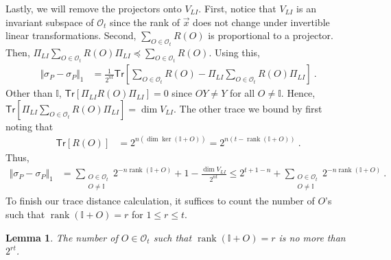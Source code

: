 \documentclass[11pt]{article}
\newtheorem{lemma}[theorem]{Lemma}
\newcommand{\id}{\ensuremath{\mathbb{I}}}
\newcommand{\Tr}{\mathsf{Tr}}
\newcommand{\Oc}{\mathcal{O}}
\DeclareMathOperator{\rank}{rank}
\begin{document}
Lastly, we will remove the projectors onto $V_{LI}$. First, notice that $V_{LI}$ is an invariant subspace of $\Oc_t$ since the rank of $\vec{x}$ does not change under invertible linear transformations. Second, $\sum_{O\in\Oc_t} R(O)$ is proportional to a projector. Then, $\Pi_{LI} \sum_{O\in\Oc_t} R(O) \Pi_{LI} \preceq \sum_{O\in\Oc_t} R(O)$. Using this,
\begin{align}
    \Vert \sigma_P - \sigma_P \Vert_1 & = \frac{1}{2^{nt}}\Tr\left[\sum_{O\in\Oc_t}R(O) - \Pi_{LI} \sum_{O\in\Oc_t} R(O) \Pi_{LI}\right]\ .
\end{align}
Other than $\id$, $\Tr[\Pi_{LI} R(O) \Pi_{LI}] = 0$ since $OY\neq Y$ for all $O\neq \id$. Hence, $\Tr[\Pi_{LI} \sum_{O\in\Oc_t} R(O) \Pi_{LI}] = \dim V_{LI}$. The other trace we bound by first noting that
\begin{align}
    \Tr[R(O)] & = 2^{n(\dim\ker(\id+O))} = 2^{n(t-\rank(\id+O))}\ .
\end{align}
Thus,
\begin{align}
    \Vert \sigma_P - \sigma_P \Vert_1 & = \sum_{\substack{O\in \Oc_{t} \\ O \neq \id}}2^{-n\rank(\id+O)}+1-\frac{\dim V_{LI}}{2^{nt}} \leq 2^{t+1-n} + \sum_{\substack{O\in \Oc_{t} \\ O \neq \id}}2^{-n\rank(\id+O)}\ .
\end{align}
To finish our trace distance calculation, it suffices to count the number of $O$'s such that $\rank(\id+O)=r$ for $1 \leq r \leq t$.
\begin{lemma}\label{lem:fixed_counting}
    The number of $O \in \Oc_{t}$ such that $\rank(\id+O) = r$ is no more than $2^{rt}$.
\end{lemma}
\end{document}
